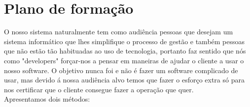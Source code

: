 \chapter{Plano de formação}
\label{plano_de_formaçao}
O nosso sistema naturalmente tem como audiência pessoas que desejam um sistema informático que lhes simplifique o processo de gestão e também pessoas que não estão tão habituadas ao uso de tecnologia, portanto faz sentido que nós como "developers" forçar-nos a pensar em maneiras de ajudar o cliente a usar o nosso software. O objetivo nunca foi e não é fazer um software complicado de usar, mas devido á nossa audiência alvo temos que fazer o esforço extra só para nos certificar que o cliente consegue fazer a operação que quer.\\
Apresentamos dois métodos:\\
